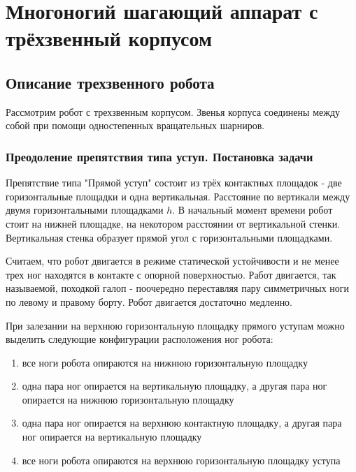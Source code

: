 
\chapter{Многоногий шагающий аппарат с трёхзвенный корпусом}
\section{Описание трехзвенного робота}

Рассмотрим робот с трехзвенным корпусом. Звенья корпуса соединены между собой при помощи одностепенных вращательных шарниров. 



\subsection{Преодоление препятствия типа уступ. Постановка задачи}


Препятствие типа "Прямой уступ" состоит из трёх контактных площадок - две горизонтальные площадки и одна вертикальная. Расстояние по вертикали между двумя горизонтальными площадками $h$. В начальный момент времени робот стоит на нижней площадке, на некотором расстоянии от вертикальной стенки. Вертикальная стенка образует прямой угол с горизонтальными площадками.

Считаем, что робот двигается в режиме статической устойчивости и не менее трех ног находятся в контакте с опорной поверхностью. Работ двигается, так называемой, походкой галоп - поочередно переставляя пару симметричных ноги по левому и правому борту. Робот двигается достаточно медленно.

При залезании на верхнюю горизонтальную площадку прямого уступам можно выделить следующие конфигурации расположения ног робота:

\begin{enumerate}
  \item все ноги робота опираются на нижнюю горизонтальную площадку
  \item одна пара ног опирается на вертикальную площадку, а другая пара ног опирается на нижнюю горизонтальную площадку
  \item одна пара ног опирается на верхнюю контактную площадку, а другая пара ног опирается на вертикальную площадку
  \item все ноги робота опираются на верхнюю горизонтальную площадку уступа
\end{enumerate}


